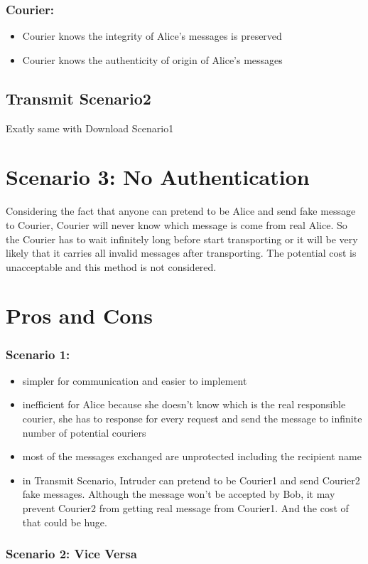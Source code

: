 \documentclass{article}
\begin{document}
\subsubsection*{Courier:}
\begin{itemize}
\item Courier knows the integrity of Alice's messages is preserved
\item Courier knows the authenticity of origin of Alice's messages
\end{itemize}
\vspace{40pt}


\subsection*{Transmit Scenario2}
Exatly same with Download Scenario1
\vspace{40pt}


\section*{Scenario 3: No Authentication}
Considering the fact that anyone can pretend to be Alice and send fake message to Courier, Courier will never know which message is come from real Alice. So the Courier has to wait infinitely long before start transporting or it will be very likely that it carries all invalid messages after transporting. The potential cost is unacceptable and this method is not considered.
\vspace{40pt}

\section*{Pros and Cons}
\subsubsection*{Scenario 1:}
\begin{itemize}
\item simpler for communication and easier to implement
\item inefficient for Alice\newline
because she doesn't know which is the real responsible courier, she has to response for every request and send the message to infinite number of potential couriers
\item most of the messages exchanged are unprotected including the recipient name
\item in Transmit Scenario, Intruder can pretend to be Courier1 and send Courier2 fake messages. Although the message won't be accepted by Bob, it may prevent Courier2 from getting real message from Courier1. And the cost of that could be huge.
\end{itemize}
\subsubsection*{Scenario 2: Vice Versa}
\end{document}

